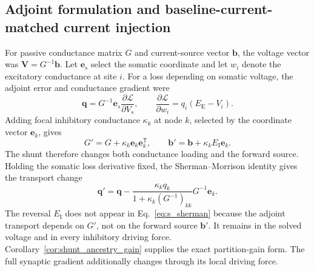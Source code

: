 \subsection{Adjoint formulation and baseline-current-matched current injection}

For passive conductance matrix $G$ and current-source vector $\bm b$, the
voltage vector was $\bm V=G^{-1}\bm b$. Let $\bm e_s$ select the somatic
coordinate and let $w_i$ denote the excitatory conductance at site $i$. For a
loss depending on somatic voltage, the adjoint error and conductance gradient
were
\begin{equation}
\bm q=G^{-1}\bm e_s\frac{\partial\mathcal L}{\partial V_s},
\qquad
\frac{\partial\mathcal L}{\partial w_i}=q_i(E_{\mathrm E}-V_i).
\end{equation}
Adding focal inhibitory conductance \(\kappa_k\) at node $k$, selected by
the coordinate vector $\bm e_k$, gives
\[
G'=G+\kappa_k\bm e_k\bm e_k^{\mathsf T},
\qquad
\bm b'=\bm b+\kappa_kE_{\mathrm I}\bm e_k .
\]
The shunt therefore changes both conductance loading and the forward source.
Holding the somatic loss derivative fixed, the Sherman--Morrison identity
gives the transport change
\begin{equation}
\bm q'=\bm q-
\frac{\kappa_kq_k}{1+\kappa_k(G^{-1})_{kk}}G^{-1}\bm e_k.
\label{eq:s_sherman}
\end{equation}
The reversal \(E_{\mathrm I}\) does not appear in
Eq.~\ref{eq:s_sherman} because the adjoint transport depends on \(G'\), not on
the forward source \(\bm b'\). It remains in the solved voltage and in every
inhibitory driving force.
Corollary~\ref{cor:shunt_ancestry_gain} supplies the exact partition-gain form. The full synaptic gradient additionally changes through its local driving force.

